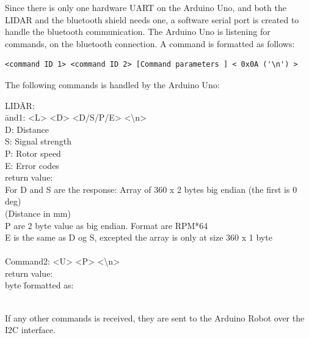 Since there is only one hardware UART on the Arduino Uno, and both the LIDAR and the bluetooth shield needs one, a software serial port is created to handle the bluetooth communication. The Arduino Uno is listening for commands, on the bluetooth connection. A command is formatted as follows:
\begin{verbatim}
<command ID 1> <command ID 2> [Command parameters ] < 0x0A ('\n') >
\end{verbatim}
The following commands is handled by the Arduino Uno: 
\begin{tabbing}	
{LID}\={AR:}\\
\={and1: <L> <D> <D/S/P/E> <\textbackslash n>} \\
\> \> D: Distance \\
\> \> S: Signal strength\\
\> \> P: Rotor speed\\
\> \> E: Error codes\\
\> return value:\\
\> \> {For D and S are the response: Array of 360 x 2 bytes big endian (the first is 0 deg)} \\ \> \> {(Distance in mm)} \\
\> \> {P are 2 byte value as big endian. Format are RPM*64} \\
\> \> {E is the same as D og S, excepted the array is only at size 360 x 1 byte} \\
\\
\> Command2: <U> <P> <\textbackslash n>\\
\> return value: \\
\>  byte \= formatted as: \\
\> \>  \\
\> \>  

\end{tabbing}	

If any other commands is received, they are sent to the Arduino Robot over the I2C interface. 

